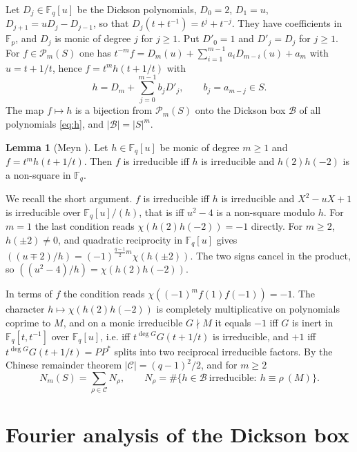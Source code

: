 \documentclass[11pt]{amsart}
\makeatletter
\theoremstyle{definition}
\newtheorem{lemma}[theorem]{Lemma}
\renewenvironment{proof}[1][\proofname]{\par\pushQED{\qed}\normalfont\topsep6\p@\@plus6\p@\relax\trivlist\item[\hskip\labelsep\upshape #1\@addpunct{.}]\ignorespaces}{\popQED\endtrivlist\@endpefalse}
\newcommand{\F}{\mathbb{F}}
\newcommand{\cB}{\mathcal{B}}
\newcommand{\cP}{\mathcal{P}}
\newcommand{\cC}{\mathcal{C}}
\makeatother
\begin{document}
Let $D_j\in\F_q[u]$ be the Dickson polynomials, $D_0=2$, $D_1=u$, $D_{j+1}=uD_j-D_{j-1}$, so that $D_j(t+t^{-1})=t^j+t^{-j}$. They have coefficients in $\F_p$, and $D_j$ is monic of degree $j$ for $j\ge1$. Put $D'_0=1$ and $D'_j=D_j$ for $j\ge1$. For $f\in\cP_m(S)$ one has $t^{-m}f=D_m(u)+\sum_{i=1}^{m-1}a_iD_{m-i}(u)+a_m$ with $u=t+1/t$, hence $f=t^mh(t+1/t)$ with
\begin{equation}\label{eq:h}
h=D_m+\sum_{j=0}^{m-1}b_jD'_j,\qquad b_j=a_{m-j}\in S.
\end{equation}
The map $f\mapsto h$ is a bijection from $\cP_m(S)$ onto the Dickson box $\cB$ of all polynomials \eqref{eq:h}, and $|\cB|=|S|^m$.

\begin{lemma}[Meyn \cite{Meyn}]\label{lem:meyn}
Let $h\in\F_q[u]$ be monic of degree $m\ge1$ and $f=t^mh(t+1/t)$. Then $f$ is irreducible iff $h$ is irreducible and $h(2)h(-2)$ is a non-square in $\F_q$.
\end{lemma}

\begin{proof}
We recall the short argument. $f$ is irreducible iff $h$ is irreducible and $X^2-uX+1$ is irreducible over $\F_q[u]/(h)$, that is iff $u^2-4$ is a non-square modulo $h$. For $m=1$ the last condition reads $\chi(h(2)h(-2))=-1$ directly. For $m\ge2$, $h(\pm2)\ne0$, and quadratic reciprocity in $\F_q[u]$ \cite[Theorem 3.3]{Rosen} gives $((u\mp2)/h)=(-1)^{\frac{q-1}{2}m}\chi(h(\pm2))$. The two signs cancel in the product, so $((u^2-4)/h)=\chi(h(2)h(-2))$.
\end{proof}

In terms of $f$ the condition reads $\chi((-1)^mf(1)f(-1))=-1$. The character $h\mapsto\chi(h(2)h(-2))$ is completely multiplicative on polynomials coprime to $M$, and on a monic irreducible $G\nmid M$ it equals $-1$ iff $G$ is inert in $\F_q[t,t^{-1}]$ over $\F_q[u]$, i.e. iff $t^{\deg G}G(t+1/t)$ is irreducible, and $+1$ iff $t^{\deg G}G(t+1/t)=PP^*$ splits into two reciprocal irreducible factors. By the Chinese remainder theorem $|\cC|=(q-1)^2/2$, and for $m\ge2$
\begin{equation}\label{eq:Nc}
N_m(S)=\sum_{\rho\in\cC}N_\rho,\qquad N_\rho=\#\{h\in\cB\ \text{irreducible}:\ h\equiv\rho\ (M)\}.
\end{equation}

\section{Fourier analysis of the Dickson box}\label{sec:fourier}
\end{document}
